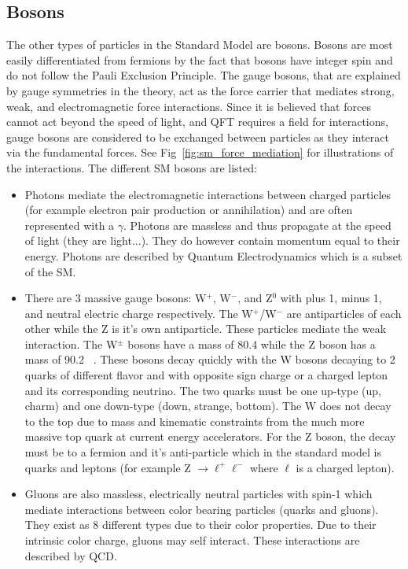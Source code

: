 \subsection{Bosons}
 The other types of particles in the Standard Model are bosons. Bosons are most easily differentiated from fermions by the fact that bosons have integer spin and do not follow the Pauli Exclusion Principle. The gauge bosons, that are explained by gauge symmetries in the theory, act as the force carrier that mediates strong, weak, and electromagnetic force interactions. Since it is believed that forces cannot act beyond the speed of light, and QFT requires a field for interactions, gauge bosons are considered to be exchanged between particles as they interact via the fundamental forces. See Fig~\ref{fig:sm_force_mediation} for illustrations of the interactions. The different SM bosons are listed:
 \begin{itemize}
 \item  Photons mediate the electromagnetic interactions between charged particles (for example electron pair production or annihilation) and are often represented with a $\gamma$. Photons are massless and thus propagate at the speed of light (they are light...). They do however contain momentum equal to their energy. Photons are described by Quantum Electrodynamics which is a subset of the SM.\\
 \item There are 3 massive gauge bosons: W$^+$, W$^-$, and Z$^0$ with plus 1, minus 1, and neutral electric charge respectively. The W$^+$/W$^-$ are antiparticles of each other while the Z is it's own antiparticle. These particles mediate the weak interaction. The W$^{\pm}$ bosons have a mass of 80.4 \GeVcc while the Z boson has a mass of 90.2 \GeVcc~\cite{pdg}. These bosons decay quickly with the W bosons decaying to 2 quarks of different flavor and with opposite sign charge or a charged lepton and its corresponding neutrino. The two quarks must be one up-type (up, charm) and one down-type (down, strange, bottom). The W does not decay to the top due to mass and kinematic constraints from the much more massive top quark at current energy accelerators. For the Z boson, the decay must be to a fermion and it's anti-particle which in the standard model is quarks and leptons (for example Z  $\rightarrow \ell^+ \ell^- $ where $\ell$ is a charged lepton).\\
 \item Gluons are also massless, electrically neutral particles with spin-1 which mediate interactions between color bearing particles (quarks and gluons). They exist as 8 different types due to their color properties. Due to their intrinsic color charge, gluons may self interact. These interactions are described by QCD.\\
 \end{itemize} 
 
